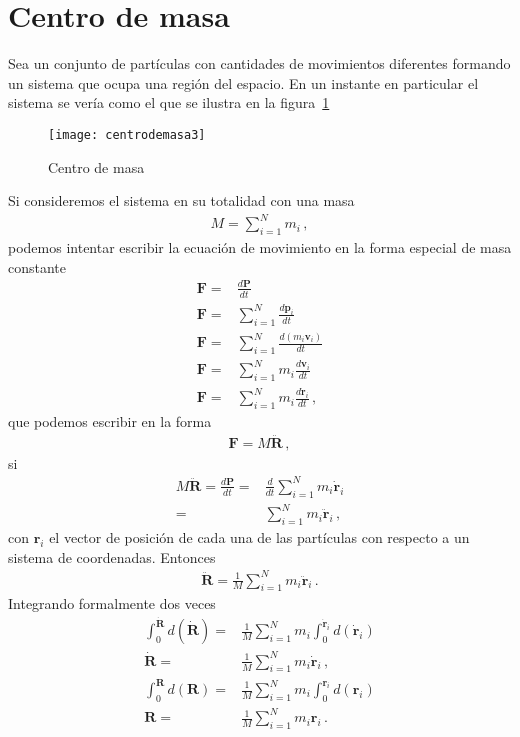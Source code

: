 \section{Centro de masa}


Sea un conjunto de partículas con cantidades de movimientos diferentes formando un sistema que ocupa una región del espacio. En un instante en particular el sistema se vería como el que se ilustra en la figura~\ref{fig:centrodemasa}
\begin{frame}
  \begin{figure}
  \centering
{\texttt{[image: centrodemasa3]}}
  \caption{Centro de masa}
  \label{fig:centrodemasa}
\end{figure}
\end{frame}

Si consideremos el sistema en su totalidad con una masa
\begin{align}
  M=\sum_{i=1}^N m_i\,,
\end{align}
podemos intentar escribir la ecuación de movimiento en la forma especial de masa constante
\begin{align}
    \mathbf{F}=&\frac{d\mathbf{P}}{dt}\nonumber\\
    \mathbf{F}=&\sum_{i=1}^N\frac{d\mathbf{p}_i}{dt}\nonumber\\
    \mathbf{F}=&\sum_{i=1}^N\frac{d(m_i\mathbf{v}_i)}{dt}\nonumber\\
    \mathbf{F}=&\sum_{i=1}^Nm_i\frac{d\mathbf{v}_i}{dt}\nonumber\\
    \mathbf{F}=&\sum_{i=1}^Nm_i\frac{d\dot{\mathbf{r}}_i}{dt}\,,
\end{align}
que podemos escribir en la forma
\begin{align}
  \label{eq:mcm}
  \mathbf{F}=M\ddot{\mathbf{R}}\,,
\end{align}
si
\begin{align}
  M\ddot{\mathbf{R}}=\frac{d\mathbf{P}}{dt}=&\frac{d}{dt}\sum_{i=1}^N m_i\dot{\mathbf{r}}_i\nonumber\\
=&\sum_{i=1}^N m_i\ddot{\mathbf{r}}_i\,,
\end{align}
con $\mathbf{r}_i$ el vector de posición de cada una de las partículas con respecto a un sistema de coordenadas. Entonces
\begin{align}
\label{eq:mveccm}
  \ddot{\mathbf{R}}=\frac{1}{M}\sum_{i=1}^Nm_i\ddot{\mathbf{r}}_i\,.
\end{align}
Integrando formalmente dos veces
\begin{align}
  \int_0^{\dot{\mathbf{R}}}d(\dot{\mathbf{R}})=&\frac{1}{M}
  \sum_{i=1}^N m_i\int_0^{\dot{\mathbf{r}}_i}d(\dot{\mathbf{r}}_i)\nonumber\\
  \dot{\mathbf{R}}=&\frac{1}{M}
  \sum_{i=1}^N m_i\dot{\mathbf{r}}_i\,,\nonumber\\
  \int_0^{{\mathbf{R}}}d({\mathbf{R}})=&\frac{1}{M}
  \sum_{i=1}^N m_i\int_0^{{\mathbf{r}}_i}d({\mathbf{r}}_i)\nonumber\\
  {\mathbf{R}}=&\frac{1}{M}
  \sum_{i=1}^N m_i{\mathbf{r}}_i\,.
\end{align}

